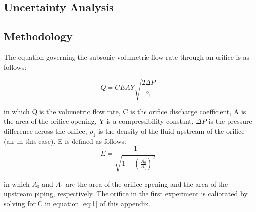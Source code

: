\documentclass[paper=letter, fontsize=10pt]{scrartcl} %
\begin{document}
\begin{appendices}
\clearpage

\iffalse
\section{Uncertainty Analysis}\label{app:Unc}
\subsection{Methodology}\label{app:Method}
\newline
\newline
The equation governing the subsonic volumetric flow rate through an orifice is as follows:

\begin{equation}\label{eq:1}
Q = C E A Y \sqrt{\frac{2 \Delta P}{\rho_1}}
\end{equation}

in which Q is the volumetric flow rate, C is the orifice discharge coefficient, A is the area of the orifice opening, Y is a compressibility constant, \(\Delta P\) is the pressure difference across the orifice, \(\rho_1\) is the density of the fluid upstream of the orifice (air in this case).  E is defined as follows:
\begin{equation}\label{eq:2}
E =  \frac{1}{\sqrt{1 - (\frac{A_0}{A_1})^2}}
\end{equation}

in which \(A_0\) and \(A_1\) are the area of the orifice opening and the area of the upstream piping, respectively.  The orifice in the first experiment is calibrated by solving for C in equation \ref{eq:1} of this appendix.  
\newline

%
%


\end{appendices}
\end{document}
